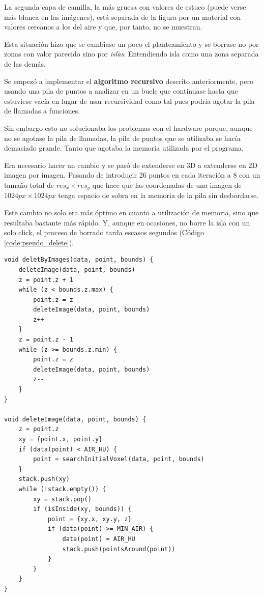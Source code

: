 La segunda capa de camilla, la más gruesa con valores de estuco (puede verse más blanca en las imágenes), está separada de la figura por un material con valores cercanos a los del aire y que, por tanto, no se muestran.

Esta situación hizo que se cambiase un poco el planteamiento y se borrase no por zonas con valor parecido sino por \textit{islas}. Entendiendo isla como una zona separada de las demás.

Se empezó a implementar el \textbf{algoritmo recursivo} descrito anteriormente, pero usando una pila de puntos a analizar en un bucle que continuase hasta que estuviese vacía en lugar de usar recursividad como tal pues podría agotar la pila de llamadas a funciones.

Sin embargo esto no solucionaba los problemas con el hardware porque, aunque no se agotase la pila de llamadas, la pila de puntos que se utilizaba se hacía demasiado grande. Tanto que agotaba la memoria utilizada por el programa.

Era necesario hacer un cambio y se pasó de extenderse en 3D a extenderse en 2D imagen por imagen. Pasando de introducir 26 puntos en cada iteración a 8 con un tamaño total de $ res_{x} \times res_{y} $ que hace que las coordenadas de una imagen de $ 1024px \times 1024px $ tenga espacio de sobra en la memoria de la pila sin desbordarse.

Este cambio no solo era más óptimo en cuanto a utilización de memoria, sino que resultaba bastante más rápido. Y, aunque en ocasiones, no borre la isla con un solo click, el proceso de borrado tarda escasos segundos (Código \ref{code:pseudo_delete}).

\begin{lstlisting}[style=C, label=code:pseudo_delete, caption={Pseudocódigo del borrado}]
void deletByImages(data, point, bounds) {
	deleteImage(data, point, bounds)
	z = point.z + 1
	while (z < bounds.z.max) {
		point.z = z
		deleteImage(data, point, bounds)
		z++
	}
	z = point.z - 1
	while (z >= bounds.z.min) {
		point.z = z
		deleteImage(data, point, bounds)
		z--
	}
}

void deleteImage(data, point, bounds) {
	z = point.z
	xy = {point.x, point.y}
	if (data(point) < AIR_HU) {
		point = searchInitialVoxel(data, point, bounds)
	}
	stack.push(xy)
	while (!stack.empty()) {
		xy = stack.pop()
		if (isInside(xy, bounds)) {
			point = {xy.x, xy.y, z}
			if (data(point) >= MIN_AIR) {
				data(point) = AIR_HU
				stack.push(pointsAround(point))
			}
		}
	}
}
\end{lstlisting}

